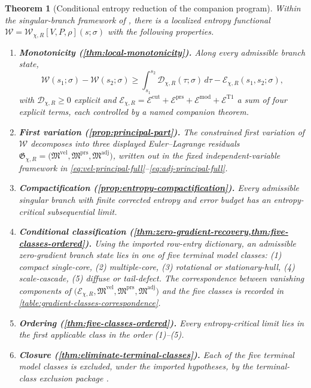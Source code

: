 \documentclass[11pt]{amsart}
\numberwithin{equation}{section}
\theoremstyle{plain}
\newtheorem{theorem}{Theorem}[section]
\theoremstyle{definition}
\theoremstyle{remark}
\newcommand{\Wloc}{\mathcal W}
\newcommand{\Diss}{\mathcal D}
\newcommand{\Err}{\mathcal E}
\newcommand{\EntropyGrad}{\mathfrak G}
\begin{document}
\begin{theorem}[Conditional entropy reduction of the companion program]
\label{thm:intro-main}
Within the singular-branch framework of
\cite{BallesterSetup,BallesterResidual,BallesterTypeII}, there is a
localized entropy functional
\(\Wloc=\Wloc_{\chi,R}[V,P,\rho](s;\sigma)\) with the following properties.
\begin{enumerate}[label=\textup{(\roman*)},leftmargin=2.2em]
	\item \textbf{Monotonicity (\cref{thm:local-monotonicity}).}
	Along every admissible branch state,
	\[
		\Wloc(s_1;\sigma)-\Wloc(s_2;\sigma)
		\ge \int_{s_1}^{s_2}\Diss_{\chi,R}(\tau;\sigma)\,d\tau
		- \Err_{\chi,R}(s_1,s_2;\sigma),
	\]
	with \(\Diss_{\chi,R}\ge 0\) explicit and
	\(\Err_{\chi,R}=\Err^{\mathrm{cut}}+\Err^{\mathrm{prs}}+\Err^{\mathrm{mod}}+\Err^{\mathrm{T1}}\)
	a sum of four explicit terms, each controlled by a named companion
	theorem.

	\item \textbf{First variation (\cref{prop:principal-part}).}
	The constrained first variation of \(\Wloc\) decomposes into three
	displayed Euler--Lagrange residuals
	\(\EntropyGrad_{\chi,R}=
	\bigl(\mathfrak M^{\mathrm{vel}},\mathfrak M^{\mathrm{prs}},\mathfrak M^{\mathrm{adj}}\bigr)\),
	written out in the fixed independent-variable framework in
	\eqref{eq:vel-principal-full}--\eqref{eq:adj-principal-full}.

	\item \textbf{Compactification (\cref{prop:entropy-compactification}).}
	Every admissible singular branch with finite corrected entropy and error
	budget has an entropy-critical subsequential limit.

	\item \textbf{Conditional classification
	(\cref{thm:zero-gradient-recovery,thm:five-classes-ordered}).}
	Using the imported row-entry dictionary, an admissible zero-gradient branch
	state lies in one of five terminal model classes:
	(1) compact single-core, (2) multiple-core, (3) rotational or
	stationary-hull, (4) scale-cascade, (5) diffuse or tail-defect.
	The correspondence between vanishing components of
	\(\bigl(\Err_{\chi,R},\mathfrak M^{\mathrm{vel}},\mathfrak M^{\mathrm{prs}},\mathfrak M^{\mathrm{adj}}\bigr)\)
	and the five classes is recorded in
	\cref{table:gradient-classes-correspondence}.

	\item \textbf{Ordering (\cref{thm:five-classes-ordered}).}  Every
	entropy-critical limit lies in the \emph{first} applicable class in the
	order (1)--(5).

	\item \textbf{Closure (\cref{thm:eliminate-terminal-classes}).}  Each of
	the five terminal model classes is excluded, under the imported
	hypotheses, by the terminal-class exclusion package
	.
\end{enumerate}
\end{theorem}
\end{document}
